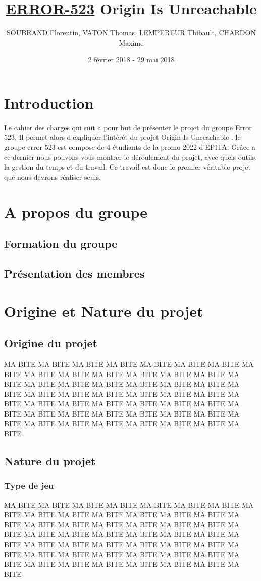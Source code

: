 \documentclass[12pt,a4paper]{article}
\title{\textbf { \huge{\underline{ERROR-523}} \bigbreak  \large{Origin Is Unreachable}}}
\author{SOUBRAND Florentin, VATON Thomas, LEMPEREUR Thibault, CHARDON Maxime}
\date {2 février 2018 - 29 mai 2018}
\begin{document}
\pagestyle{fancy}




\newpage
\thispagestyle{empty}
\tableofcontents

\newpage

\section{Introduction}
Le cahier des charges qui suit a pour but de présenter le projet du groupe Error 523. Il permet alors d'expliquer l'intérêt du projet Origin Is Unreachable . le groupe error 523 est compose de 4 étudiants de la promo 2022 d'EPITA. Grâce a ce dernier nous pouvons vous montrer le déroulement du projet, avec quels outils, la gestion du temps et du travail. Ce travail est donc le premier véritable projet que nous devrons réaliser seuls.

\newpage
\section {A propos du groupe}
\subsection{Formation du groupe}

\subsection{Présentation des membres}


\newpage
\section{Origine et Nature du projet}
\subsection{Origine du projet}
MA BITE MA BITE MA BITE MA BITE MA BITE MA BITE MA BITE MA BITE MA BITE MA BITE 
MA BITE MA BITE MA BITE MA BITE MA BITE MA BITE MA BITE MA BITE MA BITE MA BITE 
MA BITE MA BITE MA BITE MA BITE MA BITE MA BITE MA BITE MA BITE MA BITE MA BITE 
MA BITE MA BITE MA BITE MA BITE MA BITE MA BITE MA BITE MA BITE MA BITE MA BITE 
MA BITE MA BITE MA BITE MA BITE MA BITE MA BITE MA BITE MA BITE MA BITE MA BITE 
\subsection{Nature du projet}
\subsubsection{Type de jeu}
MA BITE MA BITE MA BITE MA BITE MA BITE MA BITE MA BITE MA BITE MA BITE MA BITE 
MA BITE MA BITE MA BITE MA BITE MA BITE MA BITE MA BITE MA BITE MA BITE MA BITE 
MA BITE MA BITE MA BITE MA BITE MA BITE MA BITE MA BITE MA BITE MA BITE MA BITE 
MA BITE MA BITE MA BITE MA BITE MA BITE MA BITE MA BITE MA BITE MA BITE MA BITE 
MA BITE MA BITE MA BITE MA BITE MA BITE MA BITE MA BITE MA BITE MA BITE MA BITE 
\end{document}

